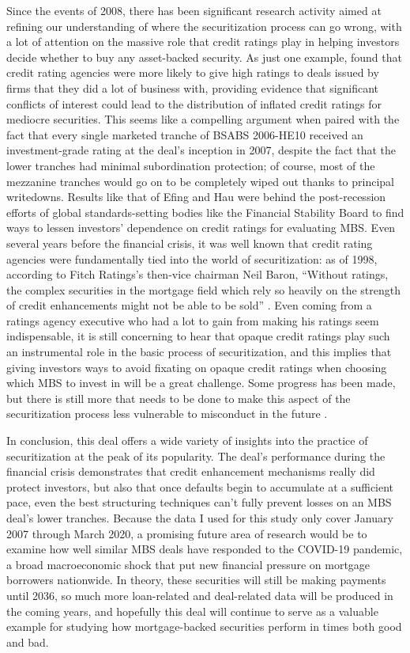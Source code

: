 \documentclass[12pt]{article}
\begin{document}
Since the events of 2008, there has been significant research activity aimed at refining our understanding of where the securitization process can go wrong, with a lot of attention on the massive role that credit ratings play in helping investors decide whether to buy any asset-backed security. As just one example, \textcite{efing14} found that credit rating agencies were more likely to give high ratings to deals issued by firms that they did a lot of business with, providing evidence that significant conflicts of interest could lead to the distribution of inflated credit ratings for mediocre securities. This seems like a compelling argument when paired with the fact that every single marketed tranche of BSABS 2006-HE10 received an investment-grade rating at the deal’s inception in 2007, despite the fact that the lower tranches had minimal subordination protection; of course, most of the mezzanine tranches would go on to be completely wiped out thanks to principal writedowns. Results like that of Efing and Hau were behind the post-recession efforts of global standards-setting bodies like the Financial Stability Board to find ways to lessen investors’ dependence on credit ratings for evaluating MBS. Even several years before the financial crisis, it was well known that credit rating agencies were fundamentally tied into the world of securitization: as of 1998, according to Fitch Ratings’s then-vice chairman Neil Baron, “Without ratings, the complex securities in the mortgage field which rely so heavily on the strength of credit enhancements might not be able to be sold” \parencite{baron98}. Even coming from a ratings agency executive who had a lot to gain from making his ratings seem indispensable, it is still concerning to hear that opaque credit ratings play such an instrumental role in the basic process of securitization, and this implies that giving investors ways to avoid fixating on opaque credit ratings when choosing which MBS to invest in will be a great challenge. Some progress has been made, but there is still more that needs to be done to make this aspect of the securitization process less vulnerable to misconduct in the future \parencite{scheicher17}.

In conclusion, this deal offers a wide variety of insights into the practice of securitization at the peak of its popularity. The deal's performance during the financial crisis demonstrates that credit enhancement mechanisms really did protect investors, but also that once defaults begin to accumulate at a sufficient pace, even the best structuring techniques can’t fully prevent losses on an MBS deal’s lower tranches. Because the data I used for this study only cover January 2007 through March 2020, a promising future area of research would be to examine how well similar MBS deals have responded to the COVID-19 pandemic, a broad macroeconomic shock that put new financial pressure on mortgage borrowers nationwide. In theory, these securities will still be making payments until 2036, so much more loan-related and deal-related data will be produced in the coming years, and hopefully this deal will continue to serve as a valuable example for studying how mortgage-backed securities perform in times both good and bad.

\newpage

\nocite{*}
\printbibliography
\end{document}
